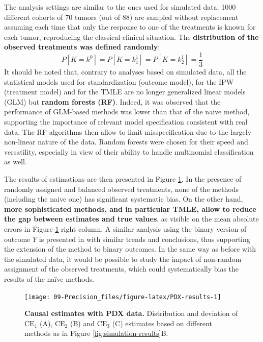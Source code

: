 \documentclass[a4paper,12pt,twoside,onecolumn,openright,final,oldfontcommands]{memoir}
\begin{document}
The analysis settings are similar to the ones used for simulated data.
1000 different cohorts of 70 tumors (out of 88) are sampled without
replacement assuming each time that only the response to one of the
treatments is known for each tumor, reproducing the classical clinical
situation. The \textbf{distribution of the observed treatments was
defined randomly}: \[P[K=k^0]=P[K=k^1_1]=P[K=k^1_2]=\dfrac{1}{3}\] It
should be noted that, contrary to analyses based on simulated data, all
the statistical models used for standardization (outcome model), for the
IPW (treatment model) and for the TMLE are no longer generalized linear
models (GLM) but \textbf{random forests (RF)}. Indeed, it was observed
that the performance of GLM-based methods was lower than that of the
naive method, supporting the importance of relevant model specification
consistent with real data. The RF algorithms then allow to limit
misspecification due to the largely non-linear nature of the data.
Random forests were chosen for their speed and versatility, especially
in view of their ability to handle multinomial classification as well.

The results of estimations are then presented in Figure
\ref{fig:PDX-results}. In the presence of randomly assigned and balanced
observed treatments, none of the methods (including the naive one) has
significant systematic bias. On the other hand, \textbf{more
sophisticated methods, and in particular TMLE, allow to reduce the gap
between estimates and true values}, as visible on the mean absolute
errors in Figure \ref{fig:PDX-results} right column. A similar analysis
using the binary version of outcome \(Y\) is presented in
\citet{beal2020causal} with similar trends and conclusions, thus
supporting the extension of the method to binary outcomes. In the same
way as before with the simulated data, it would be possible to study the
impact of non-random assignment of the observed treatments, which could
systematically bias the results of the naïve methods.

\begin{figure}

{\centering \texttt{[image: 09-Precision\_files/figure-latex/PDX-results-1]} 

}

\caption[Causal estimates with PDX data]{\textbf{Causal estimates with PDX data.}
Distribution and deviation of \(\text{CE}_1\) (A), \(\text{CE}_2\) (B)
and \(\text{CE}_3\) (C) estimates based on different methods as in
Figure \ref{fig:simulation-results}B.}\label{fig:PDX-results}
\end{figure}
\end{document}
